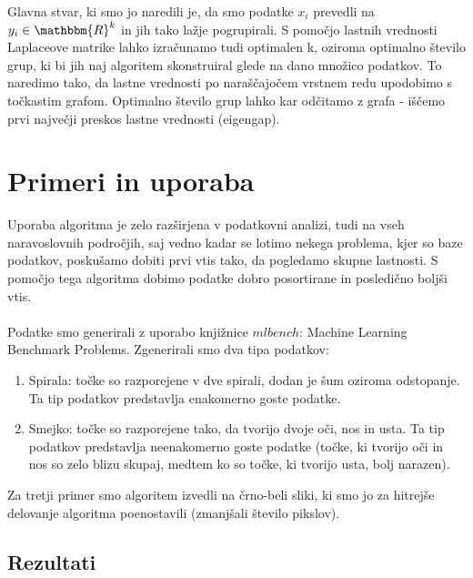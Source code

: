 \documentclass[a4paper, 10pt]{article}
\begin{document}
Glavna stvar, ki smo jo naredili je, da smo podatke $x_i$ prevedli na $y_i\in \mathbbm{R}^{k}$ in jih tako lažje pogrupirali. S pomočjo lastnih vrednosti Laplaceove matrike lahko izračunamo tudi optimalen k, oziroma optimalno število grup, ki bi jih naj algoritem skonstruiral glede na dano množico podatkov. To naredimo tako, da lastne vrednosti po naraščajočem vrstnem redu upodobimo s točkastim grafom. Optimalno število grup lahko kar odčitamo z grafa - iščemo prvi največji preskos lastne vrednosti (eigengap).
\pagebreak 
\section{Primeri in uporaba}

Uporaba algoritma je zelo razširjena v podatkovni analizi, tudi na vseh naravoslovnih
področjih, saj vedno kadar se lotimo nekega problema, kjer so baze
podatkov, poskušamo dobiti prvi vtis tako, da pogledamo skupne lastnosti. S
pomočjo tega algoritma dobimo podatke dobro posortirane in posledično boljši
vtis.\\
\\
Podatke smo generirali z uporabo knjižnice $mlbench$: Machine Learning Benchmark Problems. Zgenerirali smo dva tipa podatkov:
\begin{enumerate}
\item Spirala: točke so razporejene v dve spirali, dodan je šum oziroma odstopanje. Ta tip podatkov predstavlja enakomerno goste podatke.
\item Smejko: točke so razporejene tako, da tvorijo dvoje oči, nos in usta. Ta tip podatkov predstavlja neenakomerno goste podatke (točke, ki tvorijo oči in nos so zelo blizu skupaj, medtem ko so točke, ki tvorijo usta, bolj narazen).
\end{enumerate}
Za tretji primer smo algoritem izvedli na črno-beli sliki, ki smo jo za hitrejše delovanje algoritma poenostavili (zmanjšali število pikslov). 

\subsection{Rezultati}
\end{document}
